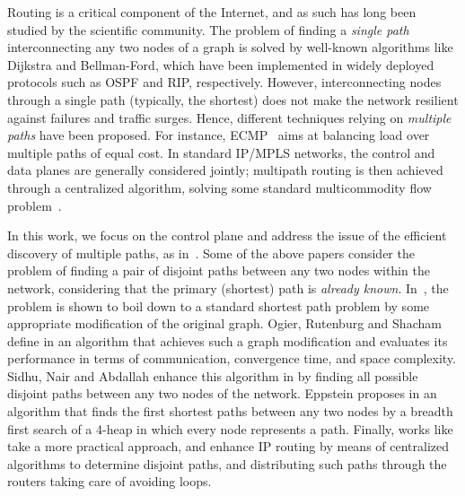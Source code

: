 \documentclass[conference]{IEEEtran}
\begin{document}
Routing is a critical component of the Internet, and as such has long been studied by the scientific community. The problem of finding a \emph{single path} interconnecting any two nodes of a graph is solved by well-known  algorithms like Dijkstra and Bellman-Ford, which have been implemented in widely deployed protocols such as OSPF and RIP, respectively. However, interconnecting nodes through a   single path (typically, the shortest) does not make the network resilient against  failures and traffic surges. Hence, different techniques relying on \emph{multiple paths} have been proposed. For instance, ECMP~\cite{HoppsRfc2992} aims at balancing load  over multiple paths of equal cost.   In standard IP/MPLS networks,  the control and data planes are generally considered jointly; multipath routing  is then achieved through a centralized algorithm, solving some  standard  multicommodity flow problem~\cite{Guerin97Globecom,Srihari01Iwqos}. 


In this work, we focus on the control plane and address the issue of the efficient discovery of  multiple paths, as in~\cite{Ogier93IEETrans,Eppstein94Fcs, Sidhu91Sigcomm,Merindol09Infocom,Johnson07Rfc4728,Blesa04Evo,Chen02ANW,Chen98Infocom}. Some of the above papers consider the problem of finding a pair of disjoint paths between any two nodes within the network, considering that the primary (shortest) path is \emph{already known}. In~\cite{Ogier93IEETrans,Eppstein94Fcs, Sidhu91Sigcomm}, the problem is shown to boil down  to a standard shortest path problem by some appropriate modification of the original graph.
Ogier, Rutenburg and Shacham define  in \cite{Ogier93IEETrans} an algorithm that achieves such a graph modification and   evaluates its performance in terms of communication, convergence time, and space complexity. 
Sidhu, Nair and Abdallah enhance this algorithm in  \cite{Sidhu91Sigcomm}  by finding all possible disjoint paths between any two nodes of the network. 
Eppstein proposes in \cite{Eppstein94Fcs} an algorithm that finds the first  shortest paths between any two nodes by a breadth first search of a 4-heap in which every node represents a path. Finally, works like~\cite{Merindol09Infocom} take a more practical approach, and enhance IP routing by means of centralized algorithms to determine disjoint paths, and distributing such paths through the routers taking care of avoiding loops. 
\end{document}
